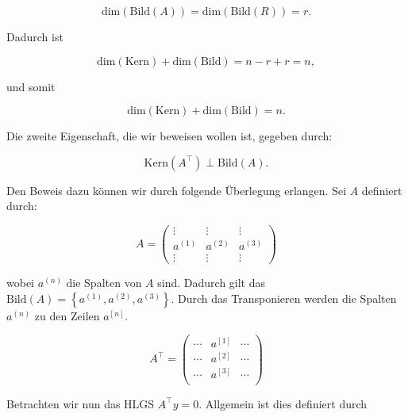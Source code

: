 \begin{equation*}
    \text{dim}(\text{Bild}(A)) = \text{dim}(\text{Bild}(R)) = r.
\end{equation*}

Dadurch ist

\begin{equation*}
    \text{dim}(\text{Kern}) + \text{dim}(\text{Bild}) = n - r + r = n, 
\end{equation*}

und somit

\begin{equation*}
    \text{dim}(\text{Kern}) + \text{dim}(\text{Bild}) = n. 
\end{equation*}

\newpage

Die zweite Eigenschaft, die wir beweisen wollen ist, gegeben durch:

\begin{equation*}
    \text{Kern}(A^\top) \perp \text{Bild}(A).
\end{equation*}

Den Beweis dazu können wir durch folgende Überlegung erlangen. Sei \( A \) definiert durch:

\begin{equation*}
    A = \begin{pmatrix}
        \vdots & \vdots & \vdots \\
        a^{(1)} & a^{(2)} & a^{(3)} \\
        \vdots & \vdots & \vdots
    \end{pmatrix}
\end{equation*}

wobei \( a^{(n)} \) die Spalten von \( A \) sind. Dadurch gilt das \( \text{Bild}(A) = \left\{ a^{(1)}, a^{(2)}, a^{(3)} \right\} \). Durch das Transponieren werden die Spalten \( a^{(n)} \) zu den Zeilen \( a^{[n]} \). 

\begin{equation*}
    A^\top = \begin{pmatrix}
        \cdots & a^{[1]} & \cdots \\
        \cdots & a^{[2]} & \cdots \\
        \cdots & a^{[3]} & \cdots \\
    \end{pmatrix}
\end{equation*}

Betrachten wir nun das HLGS \( A^\top y = 0 \). Allgemein ist dies definiert durch

